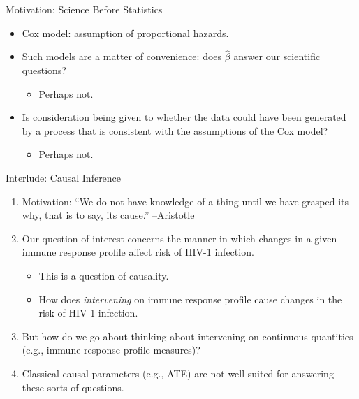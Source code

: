 \documentclass[12pt,t]{beamer}
\begin{document}
\begin{frame}[c]{Motivation: Science Before Statistics}
\begin{center}
\begin{itemize}
  \itemsep10pt
  \item Cox model: assumption of proportional hazards.
  \item Such models are a matter of convenience: does $\hat{\beta}$ answer our
    scientific questions?
    \begin{itemize}
      \item Perhaps not.
    \end{itemize}
  \item Is consideration being given to whether the data could have been
    generated by a process that is consistent with the assumptions of the Cox
    model?
    \begin{itemize}
      \item Perhaps not.
    \end{itemize}
\end{itemize}
\end{center}

\note{
}
\end{frame}


\begin{frame}[c]{Interlude: Causal Inference}

\begin{center}
\begin{enumerate}
  \itemsep10pt
  \item Motivation: ``We do not have knowledge of a thing until we have grasped
    its why, that is to say, its cause.'' --Aristotle
  \item Our question of interest concerns the manner in which changes in a given
    immune response profile affect risk of HIV-1 infection.
    \begin{itemize}
      \item This is a question of causality.
      \item How does \textit{intervening} on immune response profile cause
        changes in the risk of HIV-1 infection.
    \end{itemize}
  \item But how do we go about thinking about intervening on continuous
    quantities (e.g., immune response profile measures)?
  \item Classical causal parameters (e.g., ATE) are not well suited for
    answering these sorts of questions.
\end{enumerate}
\end{center}

\note{
}

\end{frame}
\end{document}
